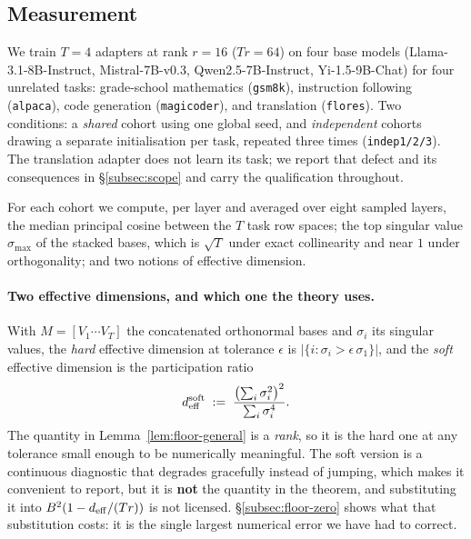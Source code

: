 \subsection{Measurement}
\label{subsec:measurement}

We train $T = 4$ adapters at rank $r = 16$ ($Tr = 64$) on four base models
(Llama-3.1-8B-Instruct, Mistral-7B-v0.3, Qwen2.5-7B-Instruct,
Yi-1.5-9B-Chat) for four unrelated tasks: grade-school mathematics
(\texttt{gsm8k}), instruction following (\texttt{alpaca}), code generation
(\texttt{magicoder}), and translation (\texttt{flores}). Two conditions: a
\emph{shared} cohort using one global seed, and \emph{independent} cohorts
drawing a separate initialisation per task, repeated three times
(\texttt{indep1/2/3}). The translation adapter does not learn its task; we
report that defect and its consequences in \S\ref{subsec:scope} and carry
the qualification throughout.

For each cohort we compute, per layer and averaged over eight sampled layers,
the median principal cosine between the $T$ task row spaces; the top singular
value $\sigma_{\max}$ of the stacked bases, which is $\sqrt{T}$ under exact
collinearity and near $1$ under orthogonality; and two notions of effective
dimension.

\paragraph{Two effective dimensions, and which one the theory uses.} With
$M = [V_1 \cdots V_T]$ the concatenated orthonormal bases and $\sigma_i$ its
singular values, the \emph{hard} effective dimension at tolerance $\epsilon$
is $|\{i : \sigma_i > \epsilon\,\sigma_1\}|$, and the \emph{soft} effective
dimension is the participation ratio
\begin{equation}\label{eq:soft-deff}
  d_{\mathrm{eff}}^{\mathrm{soft}} \;:=\; \frac{\bigl(\sum_i \sigma_i^2\bigr)^2}
  {\sum_i \sigma_i^4}.
\end{equation}
The quantity in Lemma~\ref{lem:floor-general} is a \emph{rank}, so it is the
hard one at any tolerance small enough to be numerically meaningful. The soft
version is a continuous diagnostic that degrades gracefully instead of
jumping, which makes it convenient to report, but it is \textbf{not} the
quantity in the theorem, and substituting it into $B^2(1-d_{\mathrm{eff}}/(Tr))$ is
not licensed. \S\ref{subsec:floor-zero} shows what that substitution
costs: it is the single largest numerical error we have had to correct.

